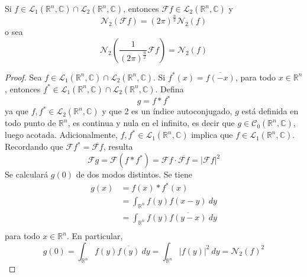 \documentclass[12pt]{report}
\theoremstyle{largebreak}
\newcommand\abs[1]{\ensuremath{\left|#1\right|}}
\newcommand\conj[1]{\ensuremath{\overline{#1}}}
\newcommand{\N}[2]{\ensuremath{\mathcal{N}_{#1}\left(#2\right)}}
\newcommand{\fou}[1]{\ensuremath{\mathcal{F}#1}}
\begin{document}
    \begin{propo}
        Si $f\in\mathcal{L}_1(\mathbb{R}^n,\mathbb{C})\cap\mathcal{L}_2(\mathbb{R}^n,\mathbb{C})$, entonces $\fou{f}\in\mathcal{L}_2(\mathbb{R}^n,\mathbb{C})$ y
        \begin{equation*}
            \N{2}{\fou{f}}=(2\pi)^{\frac{n}{2}}\N{2}{f}
        \end{equation*}
        o sea
        \begin{equation*}
            \N{2}{\frac{1}{(2\pi)^{\frac{n}{2}}}\fou{f}}=\N{2}{f}
        \end{equation*}
    \end{propo}

    \begin{proof}
        Sea $f\in\mathcal{L}_1(\mathbb{R}^n,\mathbb{C})\cap\mathcal{L}_2(\mathbb{R}^n,\mathbb{C})$. Si $f^*(x)=\conj{f(-x)}$, para todo $x\in\mathbb{R}^n$, entonces $f^*\in\mathcal{L}_1(\mathbb{R}^n,\mathbb{C})\cap\mathcal{L}_2(\mathbb{R}^n,\mathbb{C})$. Defina
        \begin{equation*}
            g=f*f^*
        \end{equation*}
        ya que $f,f^*\in\mathcal{L}_2(\mathbb{R}^n,\mathbb{C})$ y que 2 es un índice autoconjugado, $g$ está definida en todo punto de $\mathbb{R}^n$, es continua y nula en el infinito, es decir que $g\in\mathcal{C}_0(\mathbb{R}^n,\mathbb{C})$, luego acotada. Adicionalmente, $f,f^*\in\mathcal{L}_1(\mathbb{R}^n,\mathbb{C})$ implica que $f\in\mathcal{L}_1(\mathbb{R}^n,\mathbb{C})$. Recordando que $\fou{f^*}=\conj{\fou{f}}$, resulta
        \begin{equation*}
            \fou{g}=\fou{(f*f^*)}=\fou{f}\cdot\conj{\fou{f}}=\abs{\fou{f}}^2
        \end{equation*}
        Se calculará $g(0)$ de dos modos distintos. Se tiene
        \begin{equation*}
            \begin{split}
                g(x)&=f(x)*f^{*}(x)\\
                &=\int_{\mathbb{R}^n}f(y)f(x-y)\:dy\\
                &=\int_{\mathbb{R}^n}f(y)\conj{f(y-x)}\:dy\\
            \end{split}
        \end{equation*}
        para todo $x\in\mathbb{R}^n$. En particular,
        \begin{equation*}
            g(0)=\int_{\mathbb{R}^n}f(y)\conj{f(y)}\:dy=\int_{\mathbb{R}^n}\abs{f(y)}^2\:dy=\N{2}{f}^2

\end{equation*}
\end{proof}
\end{document}
